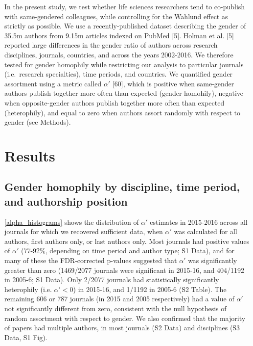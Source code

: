 \documentclass[12pt,]{article}
\begin{document}
In the present study, we test whether life sciences researchers tend to
co-publish with same-gendered colleagues, while controlling for the
Wahlund effect as strictly as possible. We use a recently-published
dataset describing the gender of 35.5m authors from 9.15m articles
indexed on PubMed {[}5{]}. Holman et al. {[}5{]} reported large
differences in the gender ratio of authors across research disciplines,
journals, countries, and across the years 2002-2016. We therefore tested
for gender homophily while restricting our analysis to particular
journals (i.e.~research specialties), time periods, and countries. We
quantified gender assortment using a metric called \(\alpha'\) {[}60{]},
which is positive when same-gender authors publish together more often
than expected (gender homohily), negative when opposite-gender authors
publish together more often than expected (heterophily), and equal to
zero when authors assort randomly with respect to gender (see Methods).

\section{Results}\label{results}

\subsection{Gender homophily by discipline, time period, and authorship
position}\label{gender-homophily-by-discipline-time-period-and-authorship-position}

\autoref{alpha_histograms} shows the distribution of \(\alpha'\)
estimates in 2015-2016 across all journals for which we recovered
sufficient data, when \(\alpha'\) was calculated for all authors, first
authors only, or last authors only. Most journals had positive values of
\(\alpha'\) (77-92\%, depending on time period and author type; S1
Data), and for many of these the FDR-corrected p-values suggested that
\(\alpha'\) was significantly greater than zero (1469/2077 journals were
significant in 2015-16, and 404/1192 in 2005-6; S1 Data). Only 2/2077
journals had statistically significantly heterophily (i.e.
\(\alpha' < 0\)) in 2015-16, and 1/1192 in 2005-6 (S2 Table). The
remaining 606 or 787 journals (in 2015 and 2005 respectively) had a
value of \(\alpha'\) not significantly different from zero, consistent
with the null hypothesis of random assortment with respect to gender. We
also confirmed that the majority of papers had multiple authors, in most
journals (S2 Data) and disciplines (S3 Data, S1 Fig).
\end{document}
